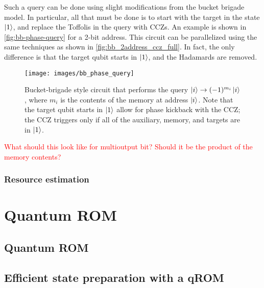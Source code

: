 \documentclass[a4paper,12pt]{article}
\newcommand\todo[1]{\textcolor{red}{#1}}
\begin{document}
Such a query can be done using slight modifications from the bucket brigade model.
In particular, all that must be done is to start with the target in the state $\ket{1}$, and replace the Toffolis in the query with CCZs.
An example is shown in \autoref{fig:bb-phase-query} for a 2-bit address. 
This circuit can be parallelized using the same techniques as shown in \autoref{fig:bb_2address_ccz_full}.
In fact, the only difference is that the target qubit starts in $\ket{1}$, and the Hadamards are removed.

\begin{figure}[ht!]
 \centering
  \captionsetup{width=.89\linewidth}
 \texttt{[image: images/bb\_phase\_query]}
 \caption{Bucket-brigade style circuit that performs the query $\ket{i} \rightarrow (-1)^{m_i}\ket{i}$, where $m_i$ is  the contents of the memory at address $\ket{i}$.
 Note that the target qubit starts in $\ket{1}$ allow for phase kickback with the CCZ; the CCZ triggers only if all of the auxiliary, memory, and targets are in $\ket{1}$.}
 \label{fig:bb-phase-query}
\end{figure}

\todo{What should this look like for multioutput bit? Should it be the product of the memory contents?}

\subsubsection{Resource estimation}



\section{Quantum ROM}
\label{sec:circuits}

\subsection{Quantum ROM}

\subsection{Efficient state preparation with a qROM}
\end{document}
